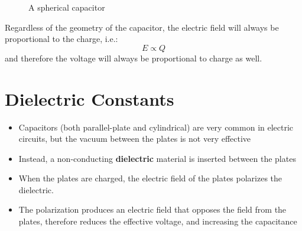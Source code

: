 \begin{figure}[ht]
  \centering
  \begin{subfigure}{.35\linewidth}
    \centering
  \end{subfigure}
  \begin{subfigure}{.35\linewidth}
    \centering
  \end{subfigure}  
  \caption{A spherical capacitor}
  \label{fig:spherical-capacitor}
\end{figure}
Regardless of the geometry of the capacitor, the electric field will always
be proportional to the charge, i.e.:
\begin{equation*}
  E\propto Q
\end{equation*}
and therefore the voltage will always be proportional to charge as well.




\section{Dielectric Constants}
\begin{figure}[ht]
  \centering
\end{figure}

\begin{itemize}
\item Capacitors (both parallel-plate and cylindrical) are very common in
  electric circuits, but the vacuum between the plates is not very effective
\item Instead, a non-conducting \textbf{dielectric} material is inserted
  between the plates
\item When the plates are charged, the electric field of the plates
  polarizes the dielectric.
\item The polarization  produces an electric field that opposes the field
  from the plates, therefore reduces the effective voltage, and increasing
  the capacitance
\end{itemize}

